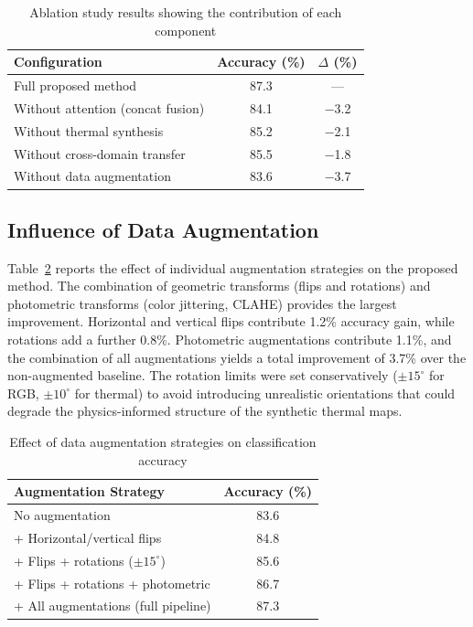 \documentclass[utf8]{FrontiersinHarvard} %
\begin{document}
\begin{table}[h!]
    \centering
    \caption{Ablation study results showing the contribution of each component}
    \label{tab:ablation}
    \footnotesize
    \begin{tabular}{lcc}
        \toprule
        \textbf{Configuration} & \textbf{Accuracy (\%)} & \textbf{$\Delta$ (\%)} \\
        \midrule
        Full proposed method & 87.3 & --- \\
        Without attention (concat fusion) & 84.1 & $-$3.2 \\
        Without thermal synthesis & 85.2 & $-$2.1 \\
        Without cross-domain transfer & 85.5 & $-$1.8 \\
        Without data augmentation & 83.6 & $-$3.7 \\
        \bottomrule
    \end{tabular}
\end{table}

\subsection{Influence of Data Augmentation}
\label{sec:augmentation_ablation}
Table~\ref{tab:augmentation} reports the effect of individual augmentation strategies on the proposed method. The combination of geometric transforms (flips and rotations) and photometric transforms (color jittering, CLAHE) provides the largest improvement. Horizontal and vertical flips contribute 1.2\% accuracy gain, while rotations add a further 0.8\%. Photometric augmentations contribute 1.1\%, and the combination of all augmentations yields a total improvement of 3.7\% over the non-augmented baseline. The rotation limits were set conservatively ($\pm 15^{\circ}$ for RGB, $\pm 10^{\circ}$ for thermal) to avoid introducing unrealistic orientations that could degrade the physics-informed structure of the synthetic thermal maps.

\begin{table}[h!]
    \centering
    \caption{Effect of data augmentation strategies on classification accuracy}
    \label{tab:augmentation}
    \footnotesize
    \begin{tabular}{lc}
        \toprule
        \textbf{Augmentation Strategy} & \textbf{Accuracy (\%)} \\
        \midrule
        No augmentation & 83.6 \\
        + Horizontal/vertical flips & 84.8 \\
        + Flips + rotations ($\pm 15^{\circ}$) & 85.6 \\
        + Flips + rotations + photometric & 86.7 \\
        + All augmentations (full pipeline) & 87.3 \\
        \bottomrule
    \end{tabular}
\end{table}
\end{document}
